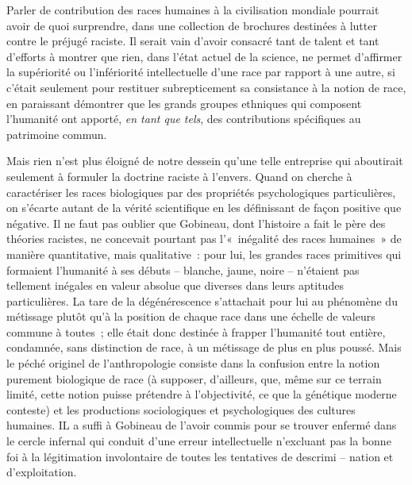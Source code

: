 \documentclass[french,twoside]{book} %
\begin{document}
\noindent Parler de contribution des races humaines à la civilisation mondiale pourrait avoir de quoi surprendre, dans une collection de brochures destinées à lutter contre le préjugé raciste. Il serait vain d’avoir consacré tant de talent et tant d’efforts à montrer que rien, dans l’état actuel de la science, ne permet d’affirmer la supériorité ou l’infériorité intellectuelle d’une race par rapport à une autre, si c’était seulement pour restituer subrepticement sa consistance à la notion de race, en paraissant démontrer que les grands groupes ethniques qui composent l’humanité ont apporté, \emph{en tant que tels}, des contributions spécifiques au patrimoine commun.\par
Mais rien n’est plus éloigné de notre dessein qu’une telle entreprise qui aboutirait seulement à formuler la doctrine raciste à l’envers. Quand on cherche à caractériser les races biologiques par des propriétés psychologiques particulières, on s’écarte autant de la vérité scientifique en les définissant de façon positive que négative. Il ne faut pas oublier que Gobineau, dont l’histoire a fait le père des théories racistes, ne concevait pourtant pas l’« inégalité des races humaines » de manière quantitative, mais qualitative : pour lui, les grandes races primitives qui formaient l’humanité à ses débuts – blanche, jaune, noire – n’étaient pas tellement inégales en valeur absolue que diverses dans leurs aptitudes particulières. La tare de la dégénérescence s’attachait pour lui au phénomène du métissage plutôt qu’à la position de chaque race dans une échelle de valeurs commune à toutes ; elle était donc destinée à frapper l’humanité tout entière, condamnée, sans distinction de race, à un métissage de plus en plus poussé. Mais le péché originel de l’anthropologie consiste dans la confusion entre la notion purement biologique de race (à supposer, d’ailleurs, que, même sur ce terrain limité, cette notion puisse prétendre à l’objectivité, ce que la génétique moderne conteste) et les productions sociologiques et psychologiques des cultures humaines. IL a suffi à Gobineau de l’avoir commis pour se trouver enfermé dans le cercle infernal qui conduit d’une erreur intellectuelle n’excluant pas la bonne foi à la légitimation involontaire de toutes les tentatives de descrimi – nation et d’exploitation.\par
\end{document}
